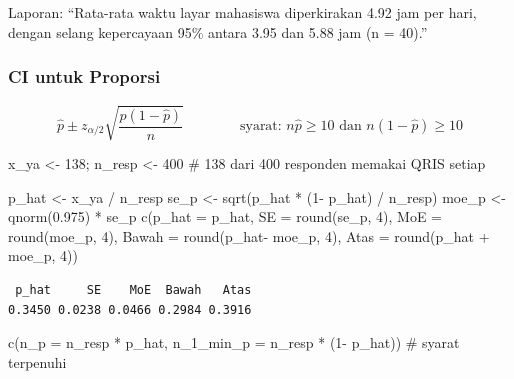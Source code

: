 \documentclass[
  indonesian,
  letterpaper,
]{book}
\newenvironment{Shaded}{\begin{snugshade}}{\end{snugshade}}
\newcommand{\AttributeTok}[1]{\textcolor[rgb]{0.40,0.45,0.13}{#1}}
\newcommand{\CommentTok}[1]{\textcolor[rgb]{0.37,0.37,0.37}{#1}}
\newcommand{\DecValTok}[1]{\textcolor[rgb]{0.68,0.00,0.00}{#1}}
\newcommand{\FloatTok}[1]{\textcolor[rgb]{0.68,0.00,0.00}{#1}}
\newcommand{\FunctionTok}[1]{\textcolor[rgb]{0.28,0.35,0.67}{#1}}
\newcommand{\NormalTok}[1]{\textcolor[rgb]{0.00,0.23,0.31}{#1}}
\newcommand{\OtherTok}[1]{\textcolor[rgb]{0.00,0.23,0.31}{#1}}
\newcommand{\SpecialCharTok}[1]{\textcolor[rgb]{0.37,0.37,0.37}{#1}}
\begin{document}
Laporan: ``Rata-rata waktu layar mahasiswa diperkirakan 4.92 jam per
hari, dengan selang kepercayaan 95\% antara 3.95 dan 5.88 jam (n =
40).''

\subsubsection{CI untuk Proporsi}\label{ci-untuk-proporsi}

\[\hat{p} \pm z_{\alpha/2} \sqrt{\frac{\hat{p}(1-\hat{p})}{n}} \qquad\qquad \text{syarat: } n\hat{p} \geq 10 \text{ dan } n(1-\hat{p}) \geq 10\]

\begin{Shaded}
\begin{Highlighting}[]
\NormalTok{x\_ya }\OtherTok{\textless{}{-}} \DecValTok{138}\NormalTok{; n\_resp }\OtherTok{\textless{}{-}} \DecValTok{400} 
\CommentTok{\# 138 dari 400 responden memakai QRIS setiap}

\NormalTok{p\_hat }\OtherTok{\textless{}{-}}\NormalTok{ x\_ya }\SpecialCharTok{/}\NormalTok{ n\_resp}
\NormalTok{se\_p }\OtherTok{\textless{}{-}} \FunctionTok{sqrt}\NormalTok{(p\_hat }\SpecialCharTok{*}\NormalTok{ (}\DecValTok{1}\SpecialCharTok{{-}}\NormalTok{ p\_hat) }\SpecialCharTok{/}\NormalTok{ n\_resp)}
\NormalTok{moe\_p }\OtherTok{\textless{}{-}} \FunctionTok{qnorm}\NormalTok{(}\FloatTok{0.975}\NormalTok{) }\SpecialCharTok{*}\NormalTok{ se\_p}
\FunctionTok{c}\NormalTok{(}\AttributeTok{p\_hat =}\NormalTok{ p\_hat, }\AttributeTok{SE =} \FunctionTok{round}\NormalTok{(se\_p, }\DecValTok{4}\NormalTok{), }\AttributeTok{MoE =} \FunctionTok{round}\NormalTok{(moe\_p, }\DecValTok{4}\NormalTok{),}
\AttributeTok{Bawah =} \FunctionTok{round}\NormalTok{(p\_hat}\SpecialCharTok{{-}}\NormalTok{ moe\_p, }\DecValTok{4}\NormalTok{), }\AttributeTok{Atas =} \FunctionTok{round}\NormalTok{(p\_hat }\SpecialCharTok{+}\NormalTok{ moe\_p, }\DecValTok{4}\NormalTok{))}
\end{Highlighting}
\end{Shaded}

\begin{verbatim}
 p_hat     SE    MoE  Bawah   Atas 
0.3450 0.0238 0.0466 0.2984 0.3916 
\end{verbatim}

\begin{Shaded}
\begin{Highlighting}[]
\FunctionTok{c}\NormalTok{(}\AttributeTok{n\_p =}\NormalTok{ n\_resp }\SpecialCharTok{*}\NormalTok{ p\_hat, }\AttributeTok{n\_1\_min\_p =}\NormalTok{ n\_resp }\SpecialCharTok{*}\NormalTok{ (}\DecValTok{1}\SpecialCharTok{{-}}\NormalTok{ p\_hat)) }\CommentTok{\# syarat terpenuhi}
\end{Highlighting}
\end{Shaded}
\end{document}
